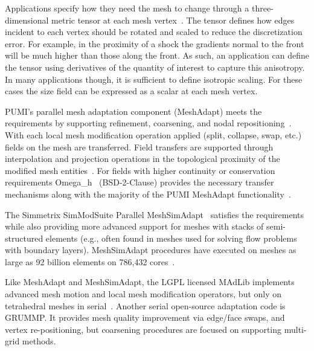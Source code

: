 Applications specify how they need the mesh to change through a
three-dimensional metric tensor at each mesh
vertex~\cite{loseille2015parallel,compere2010mesh,li20053d}.
The tensor defines how edges incident to each vertex should be rotated and
scaled to reduce the discretization error.
For example, in the proximity of a shock the gradients normal to the front will be
much higher than those along the front.
As such, an application can define the tensor using derivatives of the quantity
of interest to capture this anisotropy.
In many applications though, it is sufficient to define isotropic scaling.
For these cases the size field can be expressed as a scalar at each mesh
vertex.

PUMI's parallel mesh adaptation component (MeshAdapt) meets
the requirements by supporting refinement, coarsening, and nodal
repositioning~\cite{ibanez2016pumi}.
With each local mesh modification operation applied (split, collapse, swap, etc.)
fields on the mesh are transferred.
Field transfers are supported through interpolation and projection operations in
the topological proximity of the modified mesh
entities~\cite{ibanezthesis}.
For fields with higher continuity or conservation requirements
Omega\_h~\cite{osh_github,ibanez2016mesh} (BSD-2-Clause) provides
the necessary transfer mechanisms along with the majority of the PUMI MeshAdapt
functionality~\cite{ibanez2016mesh,ibanezthesis}.

The Simmetrix SimModSuite Parallel MeshSimAdapt~\cite{simmodsuite}
satisfies the requirements while also providing more advanced support for meshes
with stacks of semi-structured elements (e.g., often found in meshes used
for solving flow problems with boundary layers).
MeshSimAdapt procedures have executed on meshes as large as 92 billion
elements on 786,432 cores~\cite{rasquinCise2014}.

Like MeshAdapt and MeshSimAdapt, the LGPL licensed
MAdLib implements advanced mesh motion and local mesh modification
operators, but only on tetrahedral meshes in serial~\cite{compere2010mesh}.
Another serial open-source adaptation code is GRUMMP.
It provides mesh quality improvement via edge/face swaps, and vertex
re-positioning, but coarsening procedures are focused on supporting multi-grid
methods.


